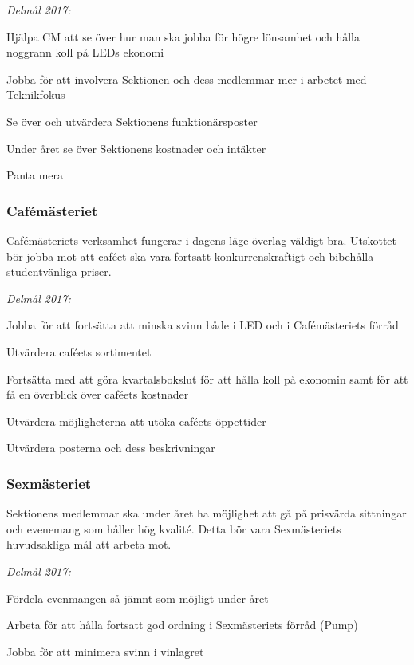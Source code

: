 \documentclass[../_main/handlingar.tex]{subfiles}
\begin{document}
\emph{Delmål 2017:}
\begin{dashlist}
    \item Hjälpa CM att se över hur man ska jobba för högre lönsamhet och hålla noggrann koll på LEDs ekonomi
    \item Jobba för att involvera Sektionen och dess medlemmar mer i arbetet med Teknikfokus
    \item Se över och utvärdera Sektionens funktionärsposter
    \item Under året se över Sektionens kostnader och intäkter
    \item Panta mera \scalebox{0.5}{\recycle}
\end{dashlist}

\subsubsection*{Cafémästeriet}
Cafémästeriets verksamhet fungerar i dagens läge överlag väldigt bra. Utskottet bör jobba mot att caféet ska vara fortsatt konkurrenskraftigt och bibehålla studentvänliga priser.

\emph{Delmål 2017:}
\begin{dashlist}
    \item Jobba för att fortsätta att minska svinn både i LED och i Cafémästeriets förråd
    \item Utvärdera caféets sortimentet
    \item Fortsätta med att göra kvartalsbokslut för att hålla koll på ekonomin samt för att få en överblick över caféets kostnader
    \item Utvärdera möjligheterna att utöka caféets öppettider
    \item Utvärdera posterna och dess beskrivningar
\end{dashlist}

\newpage

\subsubsection*{Sexmästeriet}
Sektionens medlemmar ska under året ha möjlighet att gå på prisvärda sittningar och evenemang som håller hög kvalité. Detta bör vara Sexmästeriets huvudsakliga mål att arbeta mot.

\emph{Delmål 2017:}
\begin{dashlist}
    \item Fördela evenmangen så jämnt som möjligt under året
    \item Arbeta för att hålla fortsatt god ordning i Sexmästeriets förråd (Pump)
    \item Jobba för att minimera svinn i vinlagret
\end{dashlist}
\end{document}
